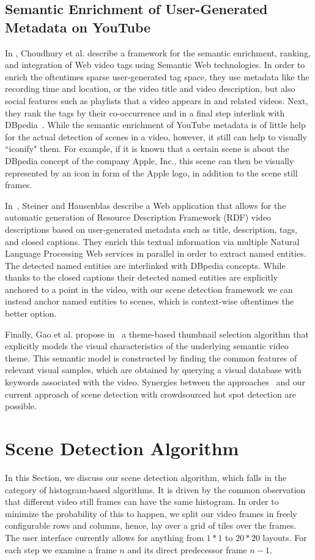 \documentclass[10pt,twocolumn,letterpaper]{article}
\begin{document}
\subsection{Semantic Enrichment of User-Generated Metadata on YouTube}
In \cite{Choudhury:YouTube}, Choudhury et al. describe a framework for the semantic enrichment, ranking, and integration of Web video tags using Semantic Web technologies. In order to enrich the oftentimes sparse user-generated tag space, they use metadata like the recording time and location, or the video title and video description, but also social features such as playlists that a video appears in and related videos. Next, they rank the tags by their co-occurrence and in a final step interlink with DBpedia~\cite{Bizer:DBpedia}. While the semantic enrichment of YouTube metadata is of little help for the actual detection of scenes in a video, however, it still can help to visually ``iconify" them. For example, if it is known that a certain scene is about the DBpedia concept of the company Apple, Inc., this scene can then be visually represented by an icon in form of the Apple logo, in addition to the scene still frames.

In~\cite{semwebvid}, Steiner and Hausenblas describe a Web application that allows for the automatic generation of Resource Description Framework (RDF) video descriptions based on user-generated metadata such as title, description, tags, and closed captions. They enrich this textual information via multiple Natural Language Processing Web services in parallel in order to extract named entities. The detected named entities are interlinked with DBpedia concepts. While thanks to the closed captions their detected named entities are explicitly anchored to a point in the video, with our scene detection framework we can instead anchor named entities to scenes, which is context-wise oftentimes the better option.

Finally, Gao et al. propose in~\cite{Gao:2009} a theme-based thumbnail selection algorithm that explicitly models the visual characteristics of the underlying semantic video theme. This semantic model is constructed by finding the common features of relevant visual samples, which are obtained by querying a visual database with keywords associated with the video. Synergies between the approaches~\cite{Choudhury:YouTube,Gao:2009,semwebvid} and our current approach of scene detection with crowdsourced hot spot detection are possible.

\section{Scene Detection Algorithm} \label{sec:details-of-algo}
In this Section, we discuss our scene detection algorithm, which falls in the category of histogram-based algorithms.  It is driven by the common observation that different video still frames can have the same histogram. In order to minimize the probability of this to happen, we split our video frames in freely configurable rows and columns, hence, lay over a grid of tiles over the frames. The user interface currently allows for anything from $1 * 1$ to $20 * 20$ layouts. For each step we examine a frame $n$ and its direct predecessor frame $n - 1$.
\end{document}
